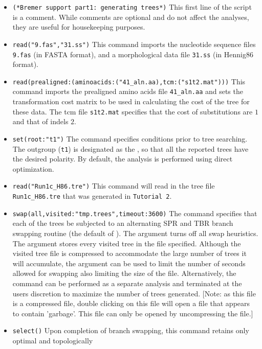 \begin{itemize}
\item \texttt{(*Bremer support part1: generating trees*)} This first
line of the script is a comment. While comments
 are optional and do not affect the analyses, they are useful for
 housekeeping purposes.
\item \texttt{read("9.fas","31.ss")} This command imports the
nucleotide sequence files \texttt{9.fas} (in FASTA format), and a
morphological data file \texttt{31.ss} (in Hennig86 format).  
\item \texttt{read(prealigned:(aminoacids:("41\_aln.aa),tcm:("s1t2.mat")))}
This command imports the prealigned amino acids file \texttt{41\_aln.aa}
and sets the transformation cost matrix to be used in calculating
the cost of the tree for these data.  The tcm file \texttt{s1t2.mat}
specifies that the cost of substitutions are $1$ and that of indels
$2$.  
\item \texttt{set(root:"t1")} The  command
specifies conditions prior to tree searching. The outgroup (\texttt{t1})
is designated as the , so that all the reported
trees have the desired polarity. By default, the analysis is performed
using direct optimization.  
\item \texttt{read("Run1c\_H86.tre")} This command will read in the 
tree file \texttt{Run1c\_H86.tre} that was generated in \texttt{Tutorial 2}.  
\item \texttt{swap(all,visited:"tmp.trees",timeout:3600)} The 
command specifies that each of the trees be subjected to an alternating
SPR and TBR branch swapping routine (the default of \poy).  The
 argument turns off all swap heuristics. The
 argument stores every visited
tree in the file specified.  Although the visited tree file is
compressed to accommodate the large number of trees it will accumulate,
the argument  can be used to limit the number
of seconds allowed for swapping also limiting the size of the file.
Alternatively,  the   command can be performed as
a separate analysis and terminated at the users discretion to
maximize the number of trees generated. [Note: as this
 file is a compressed file, double clicking
on this file will open a file that appears to contain 'garbage'.
This file can only be opened by uncompressing the file.] 
\item \texttt{select()} Upon completion of branch swapping, this command
retains only optimal and topologically

\end{itemize}
